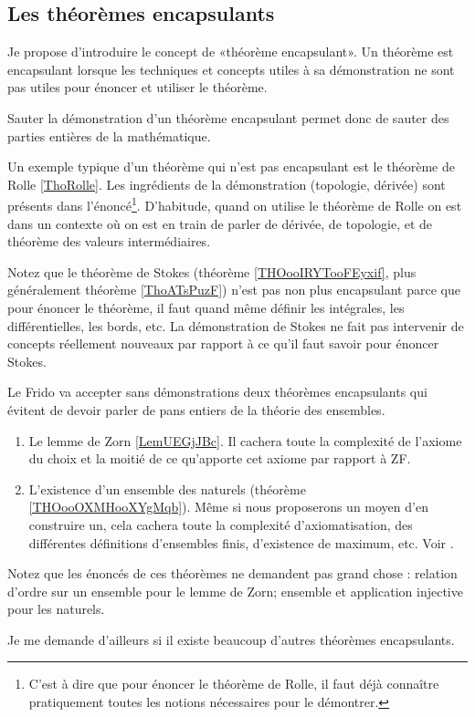 \subsection{Les théorèmes encapsulants}
\label{SUBooThmEncapsulants}

\begin{normaltext}\label{NorooThmEncapsulants}
	Je propose d'introduire le concept de «théorème encapsulant». Un théorème est encapsulant lorsque les techniques et concepts utiles à sa démonstration ne sont pas utiles pour énoncer et utiliser le théorème.

	Sauter la démonstration d'un théorème encapsulant permet donc de sauter des parties entières de la mathématique.

	Un exemple typique d'un théorème qui n'est pas encapsulant est le théorème de Rolle \ref{ThoRolle}. Les ingrédients de la démonstration (topologie, dérivée) sont présents dans l'énoncé\footnote{C'est à dire que pour énoncer le théorème de Rolle, il faut déjà connaître pratiquement toutes les notions nécessaires pour le démontrer.}. D'habitude, quand on utilise le théorème de Rolle on est dans un contexte où on est en train de parler de dérivée, de topologie, et de théorème des valeurs intermédiaires.

	Notez que le théorème de Stokes (théorème \ref{THOooIRYTooFEyxif},  plus généralement théorème \ref{ThoATsPuzF}) n'est pas non plus encapsulant parce que pour énoncer le théorème, il faut quand même définir les intégrales, les différentielles, les bords, etc. La démonstration de Stokes ne fait pas intervenir de concepts réellement nouveaux par rapport à ce qu'il faut savoir pour énoncer Stokes.

	Le Frido va accepter sans démonstrations deux théorèmes encapsulants qui évitent de devoir parler de pans entiers de la théorie des ensembles.

	\begin{enumerate}
		\item
		      Le lemme de Zorn \ref{LemUEGjJBc}. Il cachera toute la complexité de l'axiome du choix et la moitié de ce qu'apporte cet axiome par rapport à ZF.

		\item
		      L'existence d'un ensemble des naturels (théorème \ref{THOooOXMHooXYgMqb}). Même si nous proposerons un moyen d'en construire un, cela cachera toute la complexité d'axiomatisation, des différentes définitions d'ensembles finis, d'existence de maximum, etc. Voir \cite{BIBooGVVDooDoQSaM,BIBooFGIWooMkmaKH}.
	\end{enumerate}

	Notez que les énoncés de ces théorèmes ne demandent pas grand chose : relation d'ordre sur un ensemble pour le lemme de Zorn; ensemble et application injective pour les naturels.

	Je me demande d'ailleurs si il existe beaucoup d'autres théorèmes encapsulants.
\end{normaltext}

